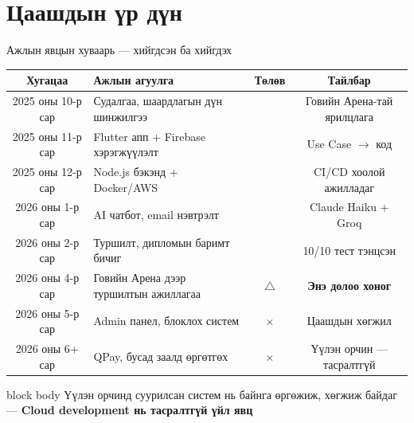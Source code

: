 \documentclass[14pt,aspectratio=169]{beamer}
\newcommand{\YES}{\textcolor{okgreen}{\checkmark}}
\newcommand{\NO}{\textcolor{badred}{$\times$}}
\newcommand{\PART}{\textcolor{partcolor}{$\triangle$}}
\begin{document}
\section{Цаашдын үр дүн}

\begin{frame}{Ажлын явцын хуваарь — хийгдсэн ба хийгдэх}
  \begin{center}
  \small
  \renewcommand{\arraystretch}{1.28}
  \begin{tabular}{clcc}
    \toprule
    \rowcolor{navyblue}
    {\color{white}\textbf{Хугацаа}} &
    {\color{white}\textbf{Ажлын агуулга}} &
    {\color{white}\textbf{Төлөв}} &
    {\color{white}\textbf{Тайлбар}} \\
    \midrule
    \rowcolor{okgreen!8}
    2025 оны 10-р сар & Судалгаа, шаардлагын дүн шинжилгээ & \YES & Говийн Арена-тай ярилцлага \\
    \rowcolor{okgreen!8}
    2025 оны 11-р сар & Flutter апп + Firebase хэрэгжүүлэлт  & \YES & Use Case $\to$ код \\
    \rowcolor{okgreen!8}
    2025 оны 12-р сар & Node.js бэкэнд + Docker/AWS           & \YES & CI/CD хоолой ажилладаг \\
    \rowcolor{okgreen!8}
    2026 оны 1-р сар  & AI чатбот, email нэвтрэлт             & \YES & Claude Haiku + Groq \\
    \rowcolor{okgreen!8}
    2026 оны 2-р сар  & Туршилт, дипломын баримт бичиг        & \YES & 10/10 тест тэнцсэн \\
    \rowcolor{goldcolor!12}
    2026 оны 4-р сар  & Говийн Арена дээр туршилтын ажиллагаа & \PART & \textbf{Энэ долоо хоног} \\
    \rowcolor{gray!6}
    2026 оны 5-р сар  & Admin панел, блоклох систем            & \NO & Цаашдын хөгжил \\
    \rowcolor{gray!6}
    2026 оны 6+ сар   & QPay, бусад заалд өргөтгөх             & \NO & Үүлэн орчин — тасралтгүй \\
    \bottomrule
  \end{tabular}
  \end{center}
  \vspace{4pt}
  \begin{beamercolorbox}[sep=4pt,center,rounded=true]{block body}
    \small Үүлэн орчинд суурилсан систем нь байнга өргөжиж, хөгжиж байдаг —
    \textbf{Cloud development нь тасралтгүй үйл явц}
  \end{beamercolorbox}
\end{frame}
\end{document}
